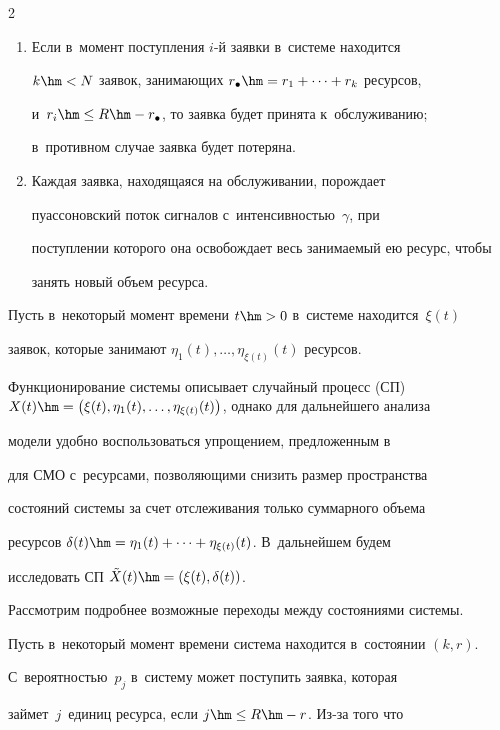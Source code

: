 \begin{multicols}{2}
\begin{enumerate}[1.]
ресурса, $r_i\hm\geq 0$, с~вероятностью~$p_{r_i}$. 

\item Если в~момент поступления $i$-й заявки в~сис\-те\-ме находится 

$k\hm<N$ заявок, занимающих $r_\bullet \hm= r_1+\cdots+r_k$ ресурсов, 

и~$r_i\hm\leq R\hm-r_\bullet$, то заявка будет принята к~обслуживанию; 

в~противном случае заявка будет потеряна.

\item Каждая заявка, находящаяся на обслуживании, порождает 

пуассоновский поток сигналов с~ин\-тен\-сив\-ностью~$\gamma$, при 

поступлении которого она освобождает весь занимаемый ею ресурс, чтобы 

занять новый объем ресурса.

  \end{enumerate}

  

  Пусть в~некоторый момент времени $t\hm>0$ в~сис\-те\-ме находится~$\xi(t)$ 

заявок, которые занимают $\eta_1(t),\ldots ,\eta_{\xi(t)}(t)$ ресурсов. 

Функционирование сис\-те\-мы описывает случайный процесс (СП) $X(t)\hm=\left( 

\xi(t), \eta_1(t),\ldots , \eta_{\xi(t)}(t)\right)$, однако для дальнейшего анализа 

модели удобно воспользоваться упрощением, предложенным в~\cite{10-sop} 

для СМО с~ресурсами, позволяющими снизить размер простран\-ства 

состояний системы за счет отслеживания только суммарного объема 

ресурсов $\delta(t)\hm= \eta_1(t)+\cdots+\eta_{\xi(t)}(t)$. В~дальнейшем будем 

исследовать СП $\tilde{X}(t)\hm= \left( \xi(t),\delta(t)\right)$. 

  

  Рассмотрим подробнее возможные переходы между состояниями системы. 

Пусть в~некоторый момент времени система находится в~состоянии $(k,r)$. 

С~вероятностью~$p_j$ в~систему может поступить заявка, которая 

займет~$j$~единиц ресурса, если $j\hm\leq R\hm-r$. Из-за того что 


\end{multicols}
